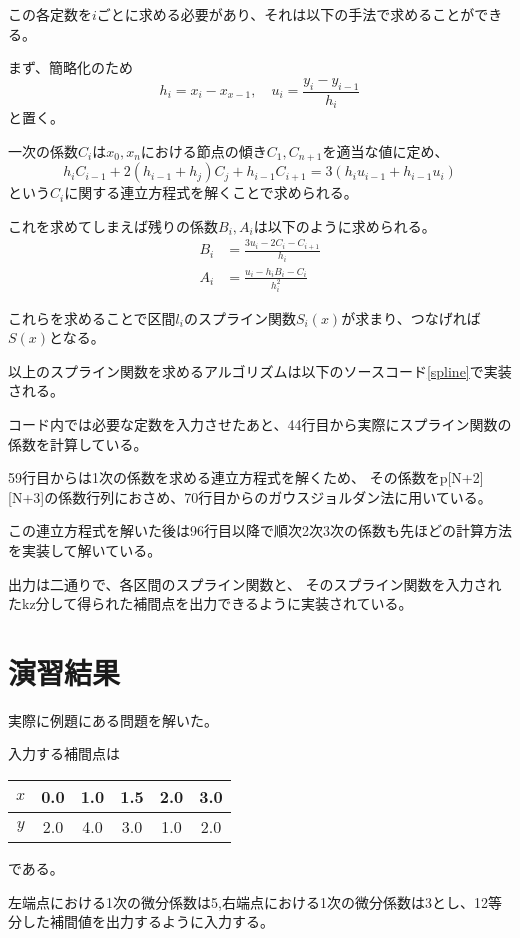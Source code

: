\documentclass[a4paper,11pt,dvipdfmx]{jsarticle}
\begin{document}
この各定数を$i$ごとに求める必要があり、それは以下の手法で求めることができる。

まず、簡略化のため
\[h_i=x_i-x_{x-1},\quad u_i=\frac{y_i-y_{i-1}}{h_i}\]
と置く。

一次の係数$C_i$は$x_0,x_n$における節点の傾き$C_1,C_{n+1}$を適当な値に定め、
\[h_iC_{i-1}+2(h_{i-1}+h_j)C_j+h_{i-1}C_{i+1}=3(h_iu_{i-1}+h_{i-1}u_i)\]
という$C_i$に関する連立方程式を解くことで求められる。

これを求めてしまえば残りの係数$B_i,A_i$は以下のように求められる。
\begin{align*}
    B_i &= \frac{3u_i-2C_i-C_{i+1}}{h_i}\\
    A_i &= \frac{u_i-h_iB_i-C_i}{h_i^2}
\end{align*}

これらを求めることで区間$l_i$のスプライン関数$S_i(x)$が求まり、つなげれば$S(x)$となる。

以上のスプライン関数を求めるアルゴリズムは以下のソースコード\ref{spline}で実装される。


コード内では必要な定数を入力させたあと、44行目から実際にスプライン関数の係数を計算している。

59行目からは1次の係数を求める連立方程式を解くため、
その係数をp[N+2][N+3]の係数行列におさめ、70行目からのガウスジョルダン法に用いている。

この連立方程式を解いた後は96行目以降で順次2次3次の係数も先ほどの計算方法を実装して解いている。

出力は二通りで、各区間のスプライン関数と、
そのスプライン関数を入力されたkz分して得られた補間点を出力できるように実装されている。

\section{演習結果}
実際に例題にある問題を解いた。

入力する補間点は
\begin{center}
    \begin{tabular}[h]{|c|c|c|c|c|c|} \hline
         $x$  & 0.0 & 1.0 & 1.5 & 2.0 & 3.0 \\ \hline
         $y$  & 2.0 & 4.0 & 3.0 & 1.0 & 2.0 \\ \hline
    \end{tabular}
\end{center}
である。

左端点における1次の微分係数は5,右端点における1次の微分係数は3とし、12等分した補間値を出力するように入力する。
\end{document}
